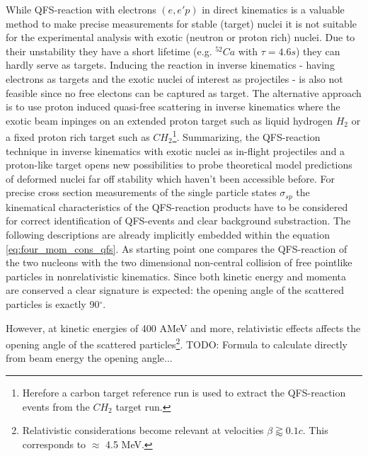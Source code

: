 While QFS-reaction with electrons $(e,e'p)$ in direct kinematics is a valuable method to make precise measurements for stable (target) nuclei it is not suitable for the experimental analysis with exotic (neutron or proton rich) nuclei. Due to their unstability they have a short lifetime (e.g. $^{52}Ca$ with $\tau = 4.6s$) they can hardly serve as targets. Inducing the reaction in inverse kinematics - having electrons as targets and the exotic nuclei of interest as projectiles - is also not feasible since no free electons can be captured as target. The alternative approach is to use proton induced quasi-free scattering in inverse kinematics where the exotic beam inpinges on an extended proton target such as liquid hydrogen $H_2$  or a fixed proton rich target such as $CH_2$\footnote{Herefore a carbon target reference run is used to extract the QFS-reaction events from the $CH_2$ target run.}.\newline
Summarizing, the QFS-reaction technique in inverse kinematics with exotic nuclei as in-flight projectiles and a proton-like target opens new possibilities to probe theoretical model predictions of deformed nuclei far off stability which haven't been accessible before.\newline
For precise cross section measurements of the single particle states $\sigma_{sp}$ the kinematical characteristics of the QFS-reaction products have to be considered for correct identification of QFS-events and clear background substraction. The following descriptions are already implicitly embedded within the equation \ref{eq:four_mom_cons_qfs}.\newline
As starting point one compares the QFS-reaction of the two nucleons with the two dimensional non-central collision of free pointlike particles in nonrelativistic kinematics. Since both kinetic energy and momenta are conserved a  clear signature is expected: the opening angle of the scattered particles is exactly 90$^{\circ}$. 

However, at kinetic energies of 400 AMeV and more, relativistic effects affects the opening angle of the scattered particles\footnote{Relativistic considerations become relevant at velocities $ \beta \gtrapprox 0.1 c$. This corresponds to $\approx$ 4.5 MeV.}. 
TODO: Formula to calculate directly from beam energy the opening angle...


